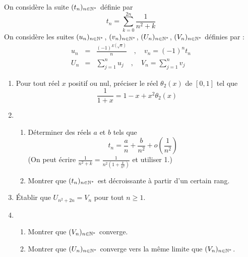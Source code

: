 On consid{\`e}re la suite $(t_n)_{n\in \mathbb{N}^{*}}$ d{\'e}finie par
\[
t_n=\sum_{k=0}^{2n}\frac 1{n^2+k}
\]
On consid{\`e}re les suites $(u_n)_{n\in \mathbb{N}^{*}}$, $(v_n)_{n\in
\mathbb{N}^{*}}$, $(U_n)_{n\in \mathbb{N}^{*}}$, $(V_n)_{n\in \N%
^{*}} $ d{\'e}finies par :
\begin{eqnarray*}
u_n &=&\frac{(-1)^{E(\sqrt{n})}}n\quad ,\quad v_n=(-1)^nt_n \\
U_n &=&\sum_{j=1}^nu_j\quad ,\quad V_n=\sum_{j=1}^nv_j
\end{eqnarray*}

\begin{enumerate}
\item  Pour tout r{\'e}el $x$ positif ou nul, pr{\'e}ciser le r{\'e}el $%
\theta _{2}(x)$ de $\left[ 0,1\right] $ tel que
\[
\frac{1}{1+x}=1-x+x^{2}\theta _{2}(x)
\]

\item \begin{enumerate}
\item D{\'e}terminer des r{\'e}els $a$ et $b$ tels que
\[
t_{n}=\frac{a}{n}+\frac{b}{n^{2}}+o(\frac{1}{n^{2}})
\]
(On peut {\'e}crire
$\frac{1}{n^{2}+k}=\frac{1}{n^{2}(1+\frac{k}{n^{2}})}$ et utiliser
1.)

\item Montrer que $(t_{n})_{n\in \mathbb{N}^{*}}$ est d{\'e}croissante
{\`a} partir d'un certain rang.
\end{enumerate}

\item {\'E}tablir que $U_{n^{2}+2n}=V_{n}$ pour tout $n\geq 1$.

\item \begin{enumerate}
\item  Montrer que $(V_{n})_{n\in \mathbb{N}^{*}}$ converge.

\item Montrer que $(U_{n})_{n\in \mathbb{N}^{*}}$ converge vers la
m{\^e}me limite que $(V_{n})_{n\in \mathbb{N}^{*}}$.\setcounter{enumi}{0}
\end{enumerate}
\end{enumerate}
